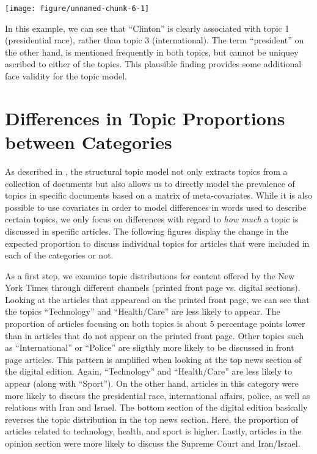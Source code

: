 \documentclass[12pt]{article}
\begin{document}
\begin{doublespace}
\begin{knitrout}
\color{fgcolor}
\texttt{[image: figure/unnamed-chunk-6-1]} 

\end{knitrout}

In this example, we can see that ``Clinton'' is clearly associated with topic 1 (presidential race), rather than topic 3 (international). The term ``president'' on the other hand, is mentioned frequently in both topics, but cannot be uniquey ascribed to either of the topics. This plausible finding provides some additional face validity for the topic model.


\section{Differences in Topic Proportions between Categories}

As described in \citet{roberts2014structural}, the structural topic model not only extracts topics from a collection of documents but also allows us to directly model the prevalence of topics in specific documents based on a matrix of meta-covariates. While it is also possible to use covariates in order to model differences in words used to describe certain topics, we only focus on differences with regard to \textit{how much} a topic is discussed in specific articles. The following figures display the change in the expected proportion to discuss individual topics for articles that were included in each of the categories or not.

As a first step, we examine topic distributions for content offered by the New York Times through different channels (printed front page vs. digital sections). Looking at the articles that appearead on the printed front page, we can see that the topics ``Technology'' and ``Health/Care'' are less likely to appear. The proportion of articles focusing on both topics is about 5 percentage points lower than in articles that do not appear on the printed front page. Other topics such as ``International'' or ``Police'' are sligthly more likely to be discussed in front page articles. This pattern is amplified when looking at the top news section of the digital edition. Again, ``Technology'' and ``Health/Care'' are less likely to appear (along with ``Sport''). On the other hand, articles in this category were more likely to discuss the presidential race, international affairs, police, as well as relations with Iran and Israel. The bottom section of the digital edition basically reverses the topic distribution in the top news section. Here, the proportion of articles related to technology, health, and sport is higher. Lastly, articles in the opinion section were more likely to discuss the Supreme Court and Iran/Israel.



\end{doublespace}
\end{document}
